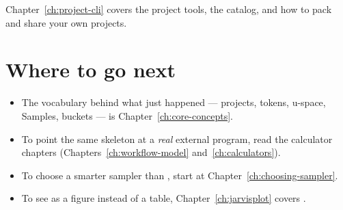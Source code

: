 Chapter~\ref{ch:project-cli} covers the project tools, the catalog, and how to pack and
share your own projects.

\section{Where to go next}

\begin{itemize}
  \item The vocabulary behind what just happened --- projects, tokens, u-space, Samples,
        buckets --- is Chapter~\ref{ch:core-concepts}.
  \item To point the same skeleton at a \emph{real} external program, read the
        calculator chapters (Chapters~\ref{ch:workflow-model}
        and~\ref{ch:calculators}).
  \item To choose a smarter sampler than , start at
        Chapter~\ref{ch:choosing-sampler}.
  \item To see  as a figure instead of a  table,
        Chapter~\ref{ch:jarvisplot} covers .
\end{itemize}
